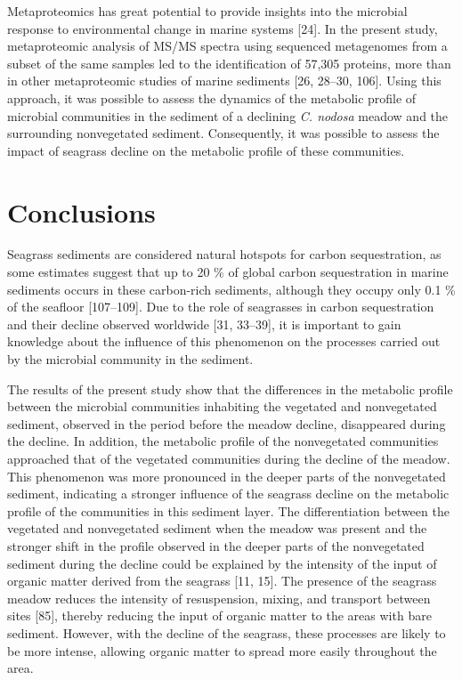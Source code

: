 \documentclass[
  12 pt,
]{article}
\begin{document}
Metaproteomics has great potential to provide insights into the microbial response to environmental change in marine systems {[}24{]}. In the present study, metaproteomic analysis of MS/MS spectra using sequenced metagenomes from a subset of the same samples led to the identification of 57,305 proteins, more than in other metaproteomic studies of marine sediments {[}26, 28--30, 106{]}. Using this approach, it was possible to assess the dynamics of the metabolic profile of microbial communities in the sediment of a declining \emph{C. nodosa} meadow and the surrounding nonvegetated sediment. Consequently, it was possible to assess the impact of seagrass decline on the metabolic profile of these communities.

\newpage

\hypertarget{conclusions}{%
\section{Conclusions}\label{conclusions}}

Seagrass sediments are considered natural hotspots for carbon sequestration, as some estimates suggest that up to 20 \si{\percent} of global carbon sequestration in marine sediments occurs in these carbon-rich sediments, although they occupy only 0.1 \si{\percent} of the seafloor {[}107--109{]}. Due to the role of seagrasses in carbon sequestration and their decline observed worldwide {[}31, 33--39{]}, it is important to gain knowledge about the influence of this phenomenon on the processes carried out by the microbial community in the sediment.

The results of the present study show that the differences in the metabolic profile between the microbial communities inhabiting the vegetated and nonvegetated sediment, observed in the period before the meadow decline, disappeared during the decline. In addition, the metabolic profile of the nonvegetated communities approached that of the vegetated communities during the decline of the meadow. This phenomenon was more pronounced in the deeper parts of the nonvegetated sediment, indicating a stronger influence of the seagrass decline on the metabolic profile of the communities in this sediment layer. The differentiation between the vegetated and nonvegetated sediment when the meadow was present and the stronger shift in the profile observed in the deeper parts of the nonvegetated sediment during the decline could be explained by the intensity of the input of organic matter derived from the seagrass {[}11, 15{]}. The presence of the seagrass meadow reduces the intensity of resuspension, mixing, and transport between sites {[}85{]}, thereby reducing the input of organic matter to the areas with bare sediment. However, with the decline of the seagrass, these processes are likely to be more intense, allowing organic matter to spread more easily throughout the area.
\end{document}
